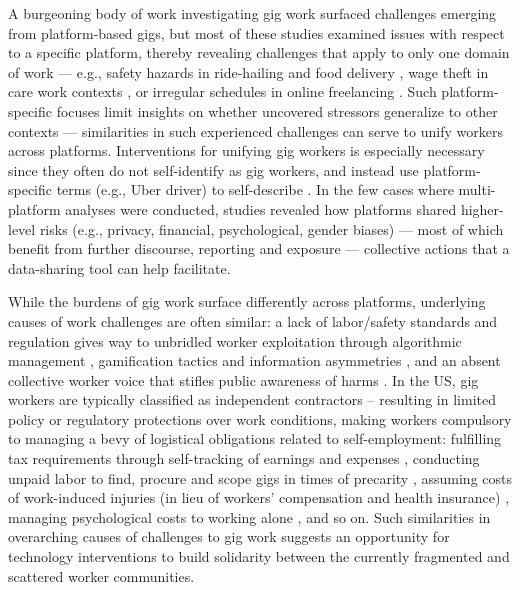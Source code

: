 {A burgeoning body of work investigating} gig work surfaced challenges emerging from {platform-based gigs}{, but most of these studies examined issues with respect to a specific platform, thereby revealing challenges that apply to only one domain of work --- e.g., safety hazards in ride-hailing and food delivery \cite{nilsenhealth, stressfulride, healthdrive, deliverysafe}, wage theft in care work contexts \cite{ming2024wage, cole2024wage, jerseycare}, or irregular schedules in online freelancing \cite{sousveillance, personal, freelancecontrol}. Such platform-specific focuses limit insights on whether uncovered stressors generalize to other contexts --- similarities in such experienced challenges can serve to unify workers across platforms. Interventions for unifying gig workers is especially necessary since they often do not self-identify as gig workers, and instead use platform-specific terms (e.g., Uber driver) to self-describe \cite{supporting}. In the few cases where multi-platform analyses were conducted, studies revealed how platforms shared higher-level risks (e.g., privacy, financial, psychological, gender biases) \cite{privacy, toward, brush} --- most of which benefit from further discourse, reporting and exposure --- collective actions that a data-sharing tool can help facilitate.}

{While the burdens of gig work surface differently across platforms, underlying causes of work challenges are often similar: a lack of labor/safety standards and regulation gives way to unbridled worker exploitation through algorithmic management \cite{dubal2023algorithmic, machines, excessive}, gamification tactics and information asymmetries \cite{algorithmic, locus, zhang2022algorithmic}, and an absent collective worker voice that stifles public awareness of harms \cite{ming2024wage, cole2024wage, lastmile}.}
In the {US}, gig workers are typically classified as independent contractors -- resulting in limited policy or regulatory protections over work conditions, {making} workers {compulsory} to manag{ing} a bevy of {logistical} obligations related to self-employment{: fulfilling tax requirements \cite{taxing, tax, tax_lives, returns} through self-}tracking {of} earnings and expenses \cite{accountable, taming}, {conducting unpaid labor to find, procure and scope gigs in times of precarity \cite{youth, apouey2020gig, freelancecontrol}, assuming costs of work-induced injuries (in lieu of workers' compensation and health insurance) \cite{nilsenhealth, healthdrive, deliverysafe, codesign}, managing psychological costs to
working alone \cite{atom, alienated, commodified}, and so on.} {Such similarities in overarching causes of challenges to gig work suggests an opportunity for technology interventions to build solidarity between the currently fragmented and scattered worker communities.}

